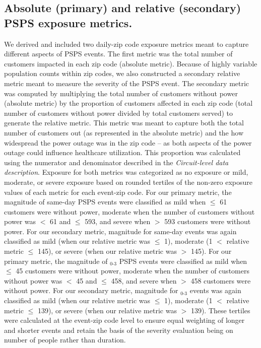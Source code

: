 \documentclass[../main.tex]{subfiles}
\begin{document}
\subsection{Absolute (primary) and relative (secondary) PSPS exposure metrics.}
We derived and included two daily-zip code exposure metrics meant to capture different aspects of PSPS events. The first metric was the total number of customers impacted in each zip code (absolute metric). Because of highly variable population counts within zip codes, we also constructed a secondary relative metric meant to measure the severity of the PSPS event. The secondary metric was computed by multiplying the total number of customers without power (absolute metric) by the proportion of customers affected in each zip code (total number of customers without power divided by total customers served) to generate the relative metric. This metric was meant to capture both the total number of customers out (as represented in the absolute metric) and the how widespread the power outage was in the zip code -- as both aspects of the power outage could influence healthcare utilization. This proportion was calculated using the numerator and denominator described in the \textit{Circuit-level data description}. Exposure for both metrics was categorized as no exposure or mild, moderate, or severe exposure based on rounded tertiles of the non-zero exposure values of each metric for each event-zip code. For our primary metric, the magnitude of same-day PSPS events were classified as mild when $\leq$ 61 customers were without power, moderate when the number of customers without power was $<$ 61 and $\leq$ 593, and severe when $>$ 593 customers were without power. For our secondary metric, magnitude for same-day events was again classified as mild (when our relative metric was $\leq$ 1), moderate (1 $<$ relative metric $\leq$ 145), or severe (when our relative metric was $>$ 145). For our primary metric, the magnitude of $_{0\text{-}3}$ PSPS events were classified as mild when $\leq$ 45 customers were without power, moderate when the number of customers without power was $<$ 45 and $\leq$ 458, and severe when $>$ 458 customers were without power. For our secondary metric, magnitude for $_{0\text{-}3}$ events was again classified as mild (when our relative metric was $\leq$ 1), moderate (1 $<$ relative metric $\leq$ 139), or severe (when our relative metric was $>$ 139). These tertiles were calculated at the event-zip code level to ensure equal weighting of longer and shorter events and retain the basis of the severity evaluation being on number of people rather than duration.  
\end{document}
